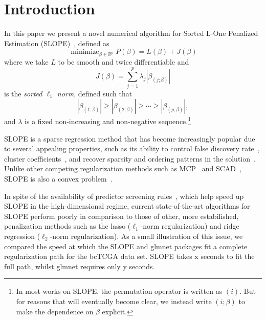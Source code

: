 \section{Introduction}\label{sec:introduction}

In this paper we present a novel numerical algorithm for Sorted L-One Penalized
Estimation (SLOPE)~\cite{bogdan2013, bogdan2015}, defined as
\begin{equation}
  \label{eq:slope-problem}
  \operatorname{minimize}_{\beta \in \mathbb{R}^p}
  P(\beta) = L(\beta) + J(\beta)
\end{equation}
where we take \(L\) to be smooth and twice differentiable and
\begin{equation}
  \label{eq:sorted-l1-norm}
  J(\beta) = \sum_{j=1}^p \lambda_j|\beta_{(j; \beta)}|
\end{equation}
is the \emph{sorted \(\ell_1\) norm}, defined such that
\[
  |\beta_{(1; \beta)}| \geq |\beta_{(2; \beta)}| \geq \cdots \geq |\beta_{(p; \beta)}|,
\]
and \(\lambda\) is a fixed non-increasing and non-negative
sequence.\footnote{In most works on SLOPE, the permutation operator is written
as \((i)\). But for reasons that will eventually become clear, we instead write
\((i; \beta)\) to make the dependence on \(\beta\) explicit.}

SLOPE is a sparse regression method that has become increasingly popular due to
several appealing properties, such as its ability to control false discovery
rate~\cite{bogdan2015, kos2020}, cluster coefficients~\cite{figueiredo2016,
schneider2020a}, and recover sparsity and ordering patterns in the
solution~\cite{bogdan2022}. Unlike other competing regularization methods such
as MCP~\cite{zhang2010} and SCAD~\cite{fan2001}, SLOPE is also a convex
problem~\cite{bogdan2015}.

In spite of the availability of predictor screening rules~\cite{elvira2022,
larsson2020c}, which help speed up SLOPE in the high-dimensional regime,
current state-of-the-art algorithms for SLOPE perform poorly in comparison to
those of other, more estabilished, penalization methods such as the lasso
(\(\ell_1\)-norm regularization) and ridge regression (\(\ell_2\)-norm
regularization). As a small illustration of this issue, we compared the
speed at which the SLOPE and glmnet packages fit a complete regularization
path for the bcTCGA data set. SLOPE takes x seconds to fit the full path,
whilst glmnet requires only y seconds.

